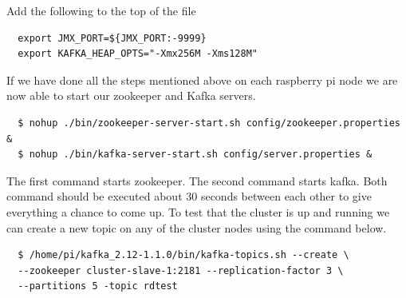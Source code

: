 Add the following to the top of the file

\begin{verbatim}
  export JMX_PORT=${JMX_PORT:-9999}
  export KAFKA_HEAP_OPTS="-Xmx256M -Xms128M"
\end{verbatim}

If we have done all the steps mentioned above on each raspberry pi node we are now able to start our zookeeper and Kafka servers.

\begin{verbatim}
  $ nohup ./bin/zookeeper-server-start.sh config/zookeeper.properties & 
  $ nohup ./bin/kafka-server-start.sh config/server.properties &
\end{verbatim}

The first command starts zookeeper. The second command starts kafka. Both command should be executed about 30 seconds between each other to give everything a chance to come up. To test that the cluster is up and running we can create a new topic on any of the cluster nodes using the command below.

\begin{verbatim}
  $ /home/pi/kafka_2.12-1.1.0/bin/kafka-topics.sh --create \
  --zookeeper cluster-slave-1:2181 --replication-factor 3 \
  --partitions 5 -topic rdtest
\end{verbatim}